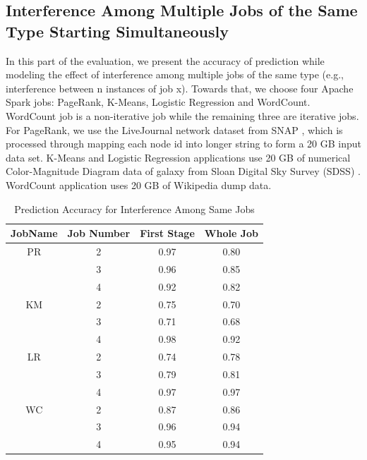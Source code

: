 \subsection{Interference Among Multiple Jobs of the Same Type Starting Simultaneously}
\noindent
In this part of the evaluation, we present the accuracy of prediction while modeling the effect of interference among multiple jobs of the same type (e.g., interference between n instances of job x). Towards that, we choose four Apache Spark jobs: PageRank, K-Means, Logistic Regression and WordCount. WordCount job is a non-iterative job while the remaining three are iterative jobs. For PageRank, we use the LiveJournal network dataset from SNAP \cite{snap}, which is processed through mapping each node id into longer string to form a 20 GB input data set. K-Means and Logistic Regression applications use 20 GB of numerical Color-Magnitude Diagram data of galaxy from Sloan Digital Sky Survey (SDSS) \cite{sdss}. WordCount application uses 20 GB of Wikipedia dump data.
\begin{table}[!t]
\renewcommand{\arraystretch}{1.3}
\caption{Prediction Accuracy for Interference Among Same Jobs}
\label{table_samejob}
\centering
\begin{tabular}{c|c|c|c}
\hline
\bfseries JobName & \bfseries Job Number & \bfseries First Stage & \bfseries Whole Job\\
\hline\hline
PR & 2 & 0.97 & 0.80\\
& 3 & 0.96 & 0.85\\
& 4 & 0.92 & 0.82\\
\hline
KM & 2 & 0.75 & 0.70\\
& 3 & 0.71 & 0.68\\
& 4 & 0.98 & 0.92\\
\hline
LR & 2 & 0.74 & 0.78\\
& 3 & 0.79 & 0.81\\
& 4 & 0.97 & 0.97 \\
\hline
WC & 2 & 0.87 & 0.86\\
& 3 & 0.96 & 0.94\\
& 4 & 0.95 & 0.94\\
\hline
\end{tabular}
\end{table}
\noindent
